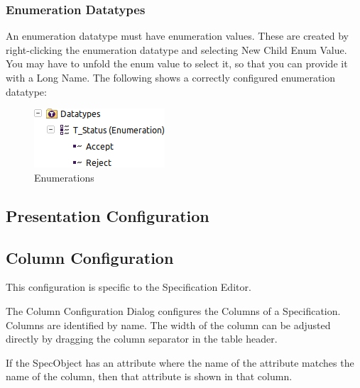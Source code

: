 \subsubsection{Enumeration Datatypes}

An enumeration datatype must have enumeration values. These are created
by right-clicking the enumeration datatype and selecting New Child
\textbar{} Enum Value. You may have to unfold the enum value to select
it, so that you can provide it with a Long Name. The following shows a
correctly configured enumeration datatype:

\begin{figure}[h!]
\centering      
\includegraphics[width=0.4\linewidth]{../rmf-images/rmf_enumeration.png}
\caption{Enumerations}      
\label{fig:Enumerations}
\end{figure}

\subsection{Presentation Configuration}

\subsection{Column Configuration}

This configuration is specific to the Specification Editor.

The Column Configuration Dialog configures the Columns of a
Specification. Columns are identified by name. The width of the column
can be adjusted directly by dragging the column separator in the table
header.

If the SpecObject has an attribute where the name of the attribute
matches the name of the column, then that attribute is shown in that
column.
